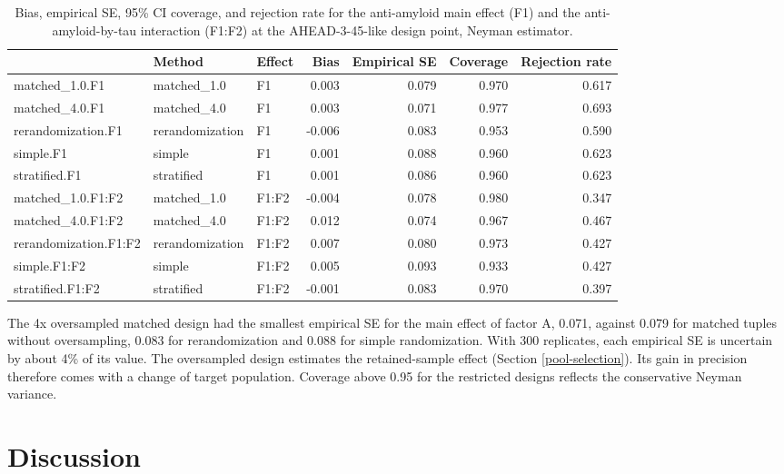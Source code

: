 \documentclass[
  11pt,
]{article}
\begin{document}
\begin{table}[!h]
\centering
\caption{\label{tab:application-estimation}Bias, empirical SE, 95\% CI coverage, and rejection rate for the anti-amyloid main effect (F1) and the anti-amyloid-by-tau interaction (F1:F2) at the AHEAD-3-45-like design point, Neyman estimator.}
\centering
\fontsize{9}{11}\selectfont
\begin{tabular}[t]{lllrrrr}
\toprule
  & Method & Effect & Bias & Empirical SE & Coverage & Rejection rate\\
\midrule
matched\_1.0.F1 & matched\_1.0 & F1 & 0.003 & 0.079 & 0.970 & 0.617\\
matched\_4.0.F1 & matched\_4.0 & F1 & 0.003 & 0.071 & 0.977 & 0.693\\
rerandomization.F1 & rerandomization & F1 & -0.006 & 0.083 & 0.953 & 0.590\\
simple.F1 & simple & F1 & 0.001 & 0.088 & 0.960 & 0.623\\
stratified.F1 & stratified & F1 & 0.001 & 0.086 & 0.960 & 0.623\\
\addlinespace
matched\_1.0.F1:F2 & matched\_1.0 & F1:F2 & -0.004 & 0.078 & 0.980 & 0.347\\
matched\_4.0.F1:F2 & matched\_4.0 & F1:F2 & 0.012 & 0.074 & 0.967 & 0.467\\
rerandomization.F1:F2 & rerandomization & F1:F2 & 0.007 & 0.080 & 0.973 & 0.427\\
simple.F1:F2 & simple & F1:F2 & 0.005 & 0.093 & 0.933 & 0.427\\
stratified.F1:F2 & stratified & F1:F2 & -0.001 & 0.083 & 0.970 & 0.397\\
\bottomrule
\end{tabular}
\end{table}

The 4x oversampled matched design had the smallest
empirical SE for the main effect of factor A,
0.071, against 0.079
for matched tuples without oversampling,
0.083 for rerandomization and
0.088 for simple randomization. With
300 replicates, each empirical SE is uncertain by
about 4\% of its value. The oversampled design estimates the
retained-sample effect (Section \ref{pool-selection}). Its
gain in precision therefore comes with a change of target
population. Coverage above 0.95 for the restricted designs
reflects the conservative Neyman variance.

\section{Discussion}\label{discussion}
\end{document}
